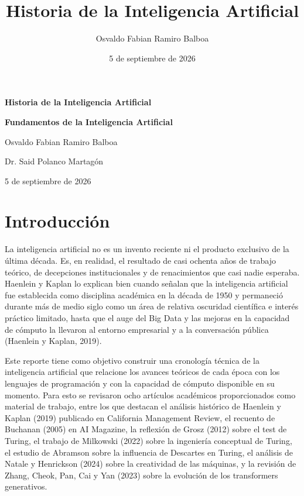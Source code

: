 \documentclass[12pt,letterpaper]{article}
\title{\textbf{Historia de la Inteligencia Artificial}}
\author{Osvaldo Fabian Ramiro Balboa}
\date{5 de septiembre de 2026}
\begin{document}
\begin{titlepage}
\centering
\vspace*{2cm}
{\LARGE \textbf{Historia de la Inteligencia Artificial}\par}
\vspace{0.5cm}
{\Large \textbf{Fundamentos de la Inteligencia Artificial}\par}
\vspace{2.5cm}
{\large Osvaldo Fabian Ramiro Balboa\par}
\vspace{0.3cm}
{\large Dr. Said Polanco Martag\'on\par}
\vfill
{\large 5 de septiembre de 2026\par}
\end{titlepage}

\tableofcontents
\newpage

\section{Introducci\'on}

La inteligencia artificial no es un invento reciente ni el producto exclusivo de la \'ultima d\'ecada. Es, en realidad, el resultado de casi ochenta a\~nos de trabajo te\'orico, de decepciones institucionales y de renacimientos que casi nadie esperaba. Haenlein y Kaplan lo explican bien cuando se\~nalan que la inteligencia artificial fue establecida como disciplina acad\'emica en la d\'ecada de 1950 y permaneci\'o durante m\'as de medio siglo como un \'area de relativa oscuridad cient\'ifica e inter\'es pr\'actico limitado, hasta que el auge del Big Data y las mejoras en la capacidad de c\'omputo la llevaron al entorno empresarial y a la conversaci\'on p\'ublica (Haenlein y Kaplan, 2019).

Este reporte tiene como objetivo construir una cronolog\'ia t\'ecnica de la inteligencia artificial que relacione los avances te\'oricos de cada \'epoca con los lenguajes de programaci\'on y con la capacidad de c\'omputo disponible en su momento. Para esto se revisaron ocho art\'iculos acad\'emicos proporcionados como material de trabajo, entre los que destacan el an\'alisis hist\'orico de Haenlein y Kaplan (2019) publicado en California Management Review, el recuento de Buchanan (2005) en AI Magazine, la reflexi\'on de Grosz (2012) sobre el test de Turing, el trabajo de Milkowski (2022) sobre la ingenier\'ia conceptual de Turing, el estudio de Abramson sobre la influencia de Descartes en Turing, el an\'alisis de Natale y Henrickson (2024) sobre la creatividad de las m\'aquinas, y la revisi\'on de Zhang, Cheok, Pan, Cai y Yan (2023) sobre la evoluci\'on de los transformers generativos.
\end{document}
